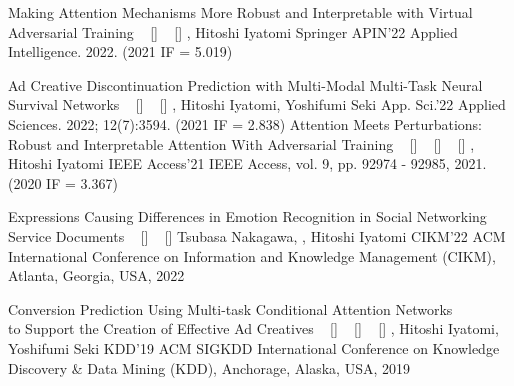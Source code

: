 \begin{publications}
    \ijpublication
    {Making Attention Mechanisms More Robust and Interpretable with Virtual Adversarial Training}
    {
    ~ [\href{https://doi.org/10.1007/s10489-022-04301-w}{\small{\doiSymbol}}]
    ~ [\href{https://arxiv.org/abs/2104.08763}{\small{\arxivSymbol}}]
    }
    {\underline{}, Hitoshi Iyatomi}
    {Springer APIN'22} {Applied Intelligence. 2022. (2021 IF = 5.019)}

    \ijpublication
    {Ad Creative Discontinuation Prediction with Multi-Modal Multi-Task Neural Survival Networks}
    {
    ~ [\href{https://doi.org/10.3390/app12073594}{\small{\doiSymbol}}]
    ~ [\href{https://arxiv.org/abs/2204.11588}{\small{\arxivSymbol}}]
    }
    {\underline{}, Hitoshi Iyatomi, Yoshifumi Seki}
    {App. Sci.'22} {Applied Sciences. 2022; 12(7):3594. (2021 IF = 2.838)}
    \ijpublication
    {Attention Meets Perturbations: Robust and Interpretable Attention With Adversarial Training}
    {
    ~ [\href{https://doi.org/10.1109/ACCESS.2021.3093456}{\small{\doiSymbol}}]
    ~ [\href{https://arxiv.org/abs/2009.12064}{\small{\arxivSymbol}}]
    ~ [\href{https://github.com/shunk031/attention-meets-perturbation}{\small{\githubSymbol}}]
    }
    {\underline{}, Hitoshi Iyatomi}
    {IEEE Access'21} {IEEE Access, vol. 9, pp. 92974 - 92985, 2021. (2020 IF = 3.367)}

    \icpublication
    {Expressions Causing Differences in Emotion Recognition in Social Networking Service Documents}
    {
    ~ [\href{https://doi.org/10.1145/3511808.3557599}{\small{\doiSymbol}}]
    ~ [\href{https://arxiv.org/abs/2208.14244}{\small{\arxivSymbol}}]
    }
    {Tsubasa Nakagawa, \underline{}, Hitoshi Iyatomi}
    {CIKM'22} {ACM International Conference on Information and Knowledge Management (CIKM), Atlanta, Georgia, USA, 2022}

    \icpublication
    {Conversion Prediction Using Multi-task Conditional Attention Networks \\ to Support the Creation of Effective Ad Creatives}
    {
    ~ [\href{https://doi.org/10.1145/3292500.3330789}{\small{\doiSymbol}}]
    ~ [\href{https://arxiv.org/abs/1905.07289}{\small{\arxivSymbol}}]
    ~ [\href{https://github.com/shunk031/Multi-task-Conditional-Attention-Networks}{\small{\githubSymbol}}]
    }
    {\underline{}, Hitoshi Iyatomi, Yoshifumi Seki}
    {KDD'19} {ACM SIGKDD International Conference on Knowledge Discovery \& Data Mining (KDD), Anchorage, Alaska, USA, 2019}


\end{publications}
